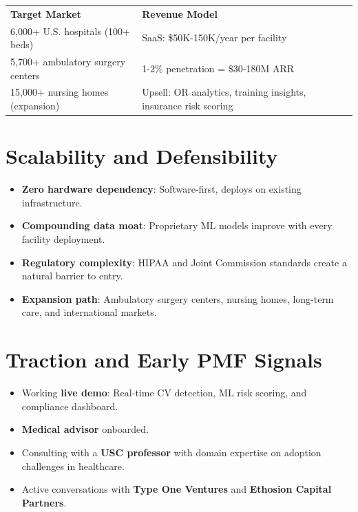 \documentclass[11pt,a4paper]{article}
\begin{document}
\begin{tabularx}{\textwidth}{X X}
    \textbf{Target Market} & \textbf{Revenue Model} \\[3pt]
    \small 6,000+ U.S. hospitals (100+ beds) & \small SaaS: \$50K{-}150K/year per facility \\
    \small 5,700+ ambulatory surgery centers & \small 1{-}2\% penetration = \$30{-}180M ARR \\
    \small 15,000+ nursing homes (expansion) & \small Upsell: OR analytics, training insights, insurance risk scoring \\
\end{tabularx}

\section{Scalability and Defensibility}

\begin{itemize}[leftmargin=1.2em, itemsep=2pt]
    \item \textbf{Zero hardware dependency}: Software-first, deploys on existing infrastructure.
    \item \textbf{Compounding data moat}: Proprietary ML models improve with every facility deployment.
    \item \textbf{Regulatory complexity}: HIPAA and Joint Commission standards create a natural barrier to entry.
    \item \textbf{Expansion path}: Ambulatory surgery centers, nursing homes, long-term care, and international markets.
\end{itemize}

\section{Traction and Early PMF Signals}

\begin{itemize}[leftmargin=1.2em, itemsep=2pt]
    \item Working \textbf{live demo}: Real-time CV detection, ML risk scoring, and compliance dashboard.
    \item \textbf{Medical advisor} onboarded.
    \item Consulting with a \textbf{USC professor} with domain expertise on adoption challenges in healthcare.
    \item Active conversations with \textbf{Type One Ventures} and \textbf{Ethosion Capital Partners}.
\end{itemize}
\end{document}
